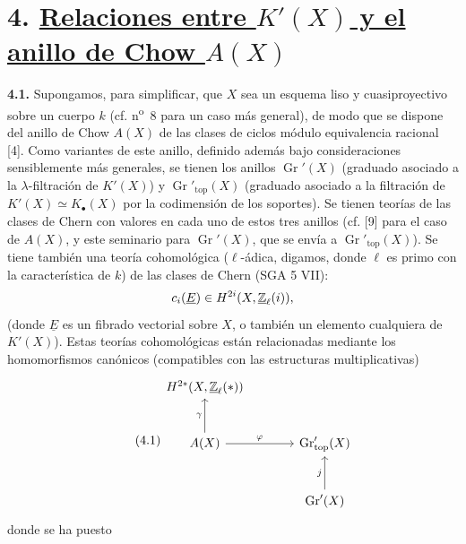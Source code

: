
\section*{4. \uline{Relaciones entre $K'(X)$ y el anillo de Chow $A(X)$}}

\textbf{4.1.} Supongamos, para simplificar, que $X$ sea un esquema liso y
cuasiproyectivo sobre un cuerpo $k$ (cf. n\textsuperscript{o}~8 para un caso
más general), de modo que se dispone del anillo de Chow $A(X)$ de las clases
de ciclos módulo equivalencia racional [4]. Como variantes de este anillo,
definido además bajo consideraciones sensiblemente más generales, se tienen
los anillos $\operatorname{Gr}'(X)$ (graduado asociado a la
$\lambda$-filtración de $K'(X)$) y
$\operatorname{Gr}'_{\mathrm{top}}(X)$ (graduado asociado a la filtración de
$K'(X)\simeq K_\bullet(X)$ por la codimensión de los soportes). Se tienen
teorías de las clases de Chern con valores en cada uno de estos tres anillos
(cf. [9] para el caso de $A(X)$, y este seminario para
$\operatorname{Gr}'(X)$, que se envía a
$\operatorname{Gr}'_{\mathrm{top}}(X)$). Se tiene también una teoría
cohomológica ($\ell$-ádica, digamos, donde $\ell$ es primo con la
característica de $k$) de las clases de Chern (SGA 5 VII):
\[
 c_i(\underline E)\in H^{2i}(X,\underline{\mathbb Z}_\ell(i)),
\]
(donde $\underline E$ es un fibrado vectorial sobre $X$, o también un
elemento cualquiera de $K'(X)$). Estas teorías cohomológicas están
relacionadas mediante los homomorfismos canónicos (compatibles con las
estructuras multiplicativas)
\begin{equation}\tag{4.1}
\begin{tikzcd}[column sep=large,row sep=large]
 H^{2*}(X,\underline{\Z}_\ell(*)) & {} \\
 A(X) \arrow[u,"\gamma"] \arrow[r,"\varphi"] & \operatorname{Gr}'_{\mathrm{top}}(X) \\
 {} & \operatorname{Gr}'(X) \arrow[u,"j"]
\end{tikzcd}
\end{equation}
donde se ha puesto
